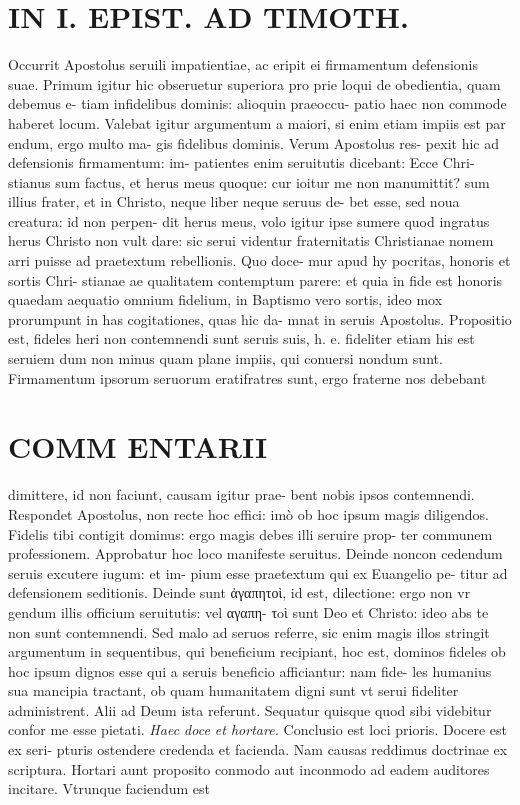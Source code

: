 \documentclass{article}
\begin{document}
\begin{pages}
\section*{IN I. EPIST. AD TIMOTH. }
\marginpar{[ p.147 ]}\pstart Occurrit Apostolus seruili impatientiae, ac eripit ei firmamentum defensionis suae. Primum igitur hic obseruetur superiora pro prie loqui de obedientia, quam debemus e- tiam infidelibus dominis: alioquin praeoccu- patio haec non commode haberet locum. Valebat igitur argumentum a maiori, si enim etiam impiis est par endum, ergo multo ma- gis fidelibus dominis. Verum Apostolus res- pexit hic ad defensionis firmamentum: im- patientes enim seruitutis dicebant: Ecce Chri- stianus sum factus, et herus meus quoque: cur ioitur me non manumittit? sum illius frater, et in Christo, neque liber neque seruus de- bet esse, sed noua creatura: id non perpen- dit herus meus, volo igitur ipse sumere quod ingratus herus Christo non vult dare: sic serui videntur fraternitatis Christianae nomem arri puisse ad praetextum rebellionis. Quo doce- mur apud hy pocritas, honoris et sortis Chri- stianae ae qualitatem contemptum parere: et quia in fide est honoris quaedam aequatio omnium fidelium, in Baptismo vero sortis, ideo mox prorumpunt in has cogitationes, quas hic da- mnat in seruis Apostolus. Propositio est, fideles heri non contemnendi sunt seruis suis, h. e. fideliter etiam his est seruiem dum non minus quam plane impiis, qui conuersi  \pend\pstart nondum sunt. Firmamentum ipsorum seruorum eratifratres sunt, ergo fraterne nos debebant  \pend
\marginpar{[ p.148 ]}
\section*{COMM ENTARII }\pstart dimittere, id non faciunt, causam igitur prae- bent nobis ipsos contemnendi. Respondet Apostolus, non recte hoc effici: imò ob hoc ipsum magis diligendos. Fidelis tibi contigit dominus: ergo magis debes illi seruire prop- ter communem professionem. Approbatur hoc loco manifeste seruitus. Deinde noncon cedendum seruis excutere iugum: et im- pium esse praetextum qui ex Euangelio pe- titur ad defensionem seditionis. Deinde sunt ἀγαπητοὶ, id est, dilectione: ergo non vr gendum illis officium seruitutis: vel αγαπη- τoὶ sunt Deo et Christo: ideo abs te non sunt contemnendi. Sed malo ad seruos referre, sic enim magis illos stringit argumentum in sequentibus, qui beneficium recipiant, hoc est, dominos fideles ob hoc ipsum dignos esse qui a seruis beneficio afficiantur: nam fide- les humanius sua mancipia tractant, ob quam humanitatem digni sunt vt serui fideliter administrent. Alii ad Deum ista referunt. Sequatur quisque quod sibi videbitur confor me esse pietati.  \pend
\textit{Haec doce et hortare. }\pstart Conclusio est loci prioris. Docere est ex seri- pturis ostendere credenda et facienda. Nam causas reddimus doctrinae ex scriptura. Hortari aunt proposito conmodo aut inconmodo ad eadem auditores incitare. Vtrunque faciendum est  \pend

\end{pages}
\end{document}
